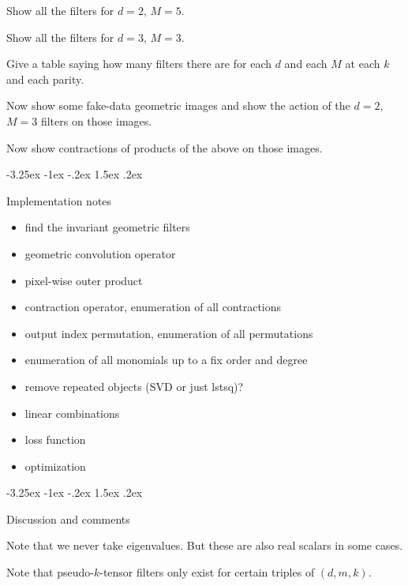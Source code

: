 \documentclass{article}
\makeatletter
\theoremstyle{plain}
\renewcommand\section{\@startsection {section}{1}{\z@}%
  {-3.25ex \@plus -1ex \@minus -.2ex}%
  {1.5ex \@plus .2ex}%
  {\raggedright\normalfont\large\bfseries}}
\makeatother
\begin{document}
Show all the filters for $d=2$, $M=5$.

Show all the filters for $d=3$, $M=3$.

Give a table saying how many filters there are for each $d$ and each $M$ at each $k$ and each parity.

Now show some fake-data geometric images and show the action of the $d=2$, $M=3$ filters on those images.

Now show contractions of products of the above on those images.

\section{Implementation notes}
\begin{itemize}
    \item find the invariant geometric filters
    \item geometric convolution operator
    \item pixel-wise outer product
    \item contraction operator, enumeration of all contractions
    \item output index permutation, enumeration of all permutations
    \item enumeration of all monomials up to a fix order and degree 
    \item remove repeated objects (SVD or just lstsq)?
    \item linear combinations 
    \item loss function
    \item optimization
\end{itemize}

\section{Discussion and comments}

Note that we never take eigenvalues. But these are also real scalars in some cases.

Note that pseudo-$k$-tensor filters only exist for certain triples of $(d, m, k)$.
\end{document}
